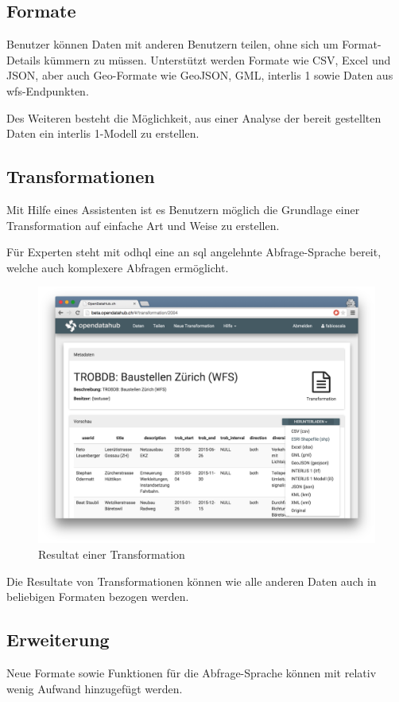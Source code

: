 \subsection*{Formate}
Benutzer können Daten mit anderen Benutzern teilen, ohne sich um Format-Details kümmern zu müssen. Unterstützt werden Formate wie CSV, Excel und JSON, aber auch Geo-Formate wie GeoJSON, GML, \gls{interlis} 1 sowie Daten aus \gls{wfs}-Endpunkten.

Des Weiteren besteht die Möglichkeit, aus einer Analyse der bereit gestellten Daten ein \gls{interlis} 1-Modell zu erstellen.

\subsection*{Transformationen}
Mit Hilfe eines Assistenten ist es Benutzern möglich die Grundlage einer Transformation auf einfache Art und Weise zu erstellen. 

Für Experten steht mit \gls{odhql} eine an \acs{sql} angelehnte Abfrage-Sprache bereit, welche auch komplexere Abfragen ermöglicht.

\begin{figure}[H]
    \centering
    \includegraphics[width=0.8\linewidth]{fig/transformation-detail}
    \vspace{-0.5cm}\caption*{Resultat einer Transformation}
\end{figure}

Die Resultate von Transformationen können wie alle anderen Daten auch in beliebigen Formaten bezogen werden.

\subsection*{Erweiterung}
Neue Formate sowie Funktionen für die Abfrage-Sprache können mit relativ wenig Aufwand hinzugefügt werden.

